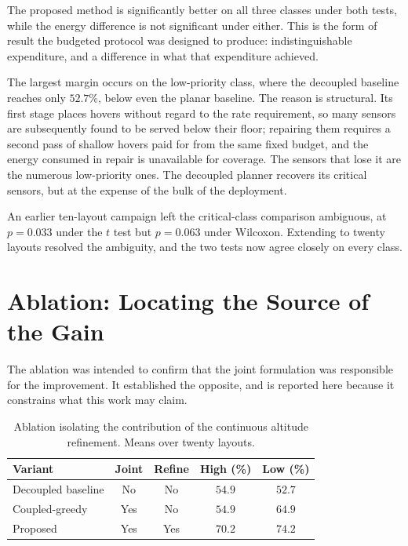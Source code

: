 The proposed method is significantly better on all three classes under both tests, while the energy difference is not significant under either. This is the form of result the budgeted protocol was designed to produce: indistinguishable expenditure, and a difference in what that expenditure achieved.

The largest margin occurs on the low-priority class, where the decoupled baseline reaches only $52.7\%$, below even the planar baseline. The reason is structural. Its first stage places hovers without regard to the rate requirement, so many sensors are subsequently found to be served below their floor; repairing them requires a second pass of shallow hovers paid for from the same fixed budget, and the energy consumed in repair is unavailable for coverage. The sensors that lose it are the numerous low-priority ones. The decoupled planner recovers its critical sensors, but at the expense of the bulk of the deployment.

An earlier ten-layout campaign left the critical-class comparison ambiguous, at $p = 0.033$ under the $t$ test but $p = 0.063$ under Wilcoxon. Extending to twenty layouts resolved the ambiguity, and the two tests now agree closely on every class.

\section{Ablation: Locating the Source of the Gain}
\label{sec:ablation}

The ablation was intended to confirm that the joint formulation was responsible for the improvement. It established the opposite, and is reported here because it constrains what this work may claim.

\begin{table}[!ht]
\centering
\caption[Ablation of the refinement stage]{Ablation isolating the contribution of the continuous altitude refinement. Means over twenty layouts.}
\label{tab:ablation}
\begin{tabular}{lcccc}
\toprule
\textbf{Variant} & \textbf{Joint} & \textbf{Refine} & \textbf{High (\%)} & \textbf{Low (\%)} \\
\midrule
Decoupled baseline & No & No & $54.9$ & $52.7$ \\
Coupled-greedy & Yes & No & $54.9$ & $64.9$ \\
Proposed & Yes & Yes & $\mathbf{70.2}$ & $\mathbf{74.2}$ \\
\bottomrule
\end{tabular}
\end{table}

